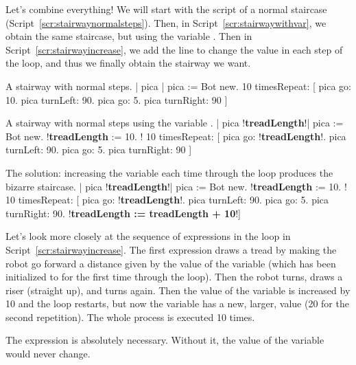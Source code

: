 \documentclass[a4paper,10pt,twoside]{book}
\begin{document}
Let’s combine everything! We will start with the script of a normal staircase (Script~\ref{scr:stairwaynormalsteps}). Then, in Script~\ref{scr:stairwaywithvar}, we obtain the same staircase, but using the variable . Then in Script~\ref{scr:stairwayincrease}, we add the line  to change the  value in each step of the loop, and thus we finally obtain the stairway we want. 



\begin{script}[stairwaynormalsteps]{A stairway with normal steps.}
| pica | 
pica := Bot new. 
10 timesRepeat: 
	[ pica go: 10. 
	pica turnLeft: 90. 
	pica go: 5. 
	pica turnRight: 90 ] 
\end{script}


\begin{script}[stairwaywithvar]{A stairway with normal steps using the variable .}
| pica !\textbf{treadLength}!| 
pica := Bot new. 
!\textbf{treadLength} := 10. !
10 timesRepeat: 
	[ pica go: !\textbf{treadLength}!. 
	pica turnLeft: 90. 
	pica go: 5. 
	pica turnRight: 90 ]
\end{script}

\begin{script}[stairwayincrease]{The solution: increasing the variable  each time through the loop produces the bizarre staircase.}
| pica !\textbf{treadLength}!| 
pica := Bot new. 
!\textbf{treadLength} := 10. !
10 timesRepeat: 
	[ pica go: !\textbf{treadLength}!. 
	pica turnLeft: 90. 
	pica go: 5. 
	pica turnRight: 90. 
	!\textbf{treadLength := treadLength + 10}!] 
\end{script}

Let’s look more closely at the sequence of expressions in the loop in Script~\ref{scr:stairwayincrease}. The first expression draws a tread by making the robot go forward a distance given by the value of the 
variable  (which has been initialized to  for the first time through the loop). 
Then the robot turns, draws a riser (straight up), and turns again. Then the value of the variable  is increased by 10 and the loop restarts, but now the variable  
has a new, larger, value (20 for the second repetition). The whole process is executed 10 times.

The expression  is absolutely necessary. Without it, the 
value of the variable would never change. 
\end{document}
